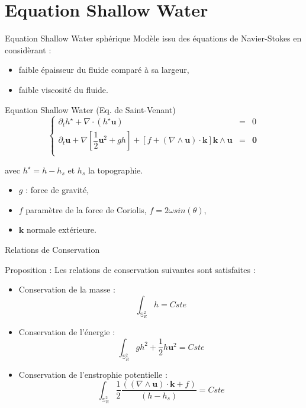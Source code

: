 \documentclass[11pt]{beamer}
\def\gint{\displaystyle\int}
\begin{document}
\section{Equation Shallow Water}
\begin{frame}{Equation Shallow Water sphérique}
Modèle issu des équations de Navier-Stokes en considèrant :
\begin{itemize}
\item faible épaisseur du fluide comparé à sa largeur,
\item faible viscosité du fluide.
\end{itemize}

\pause
\begin{block}{Equation Shallow Water (Eq. de Saint-Venant)}
\begin{equation}
\left\lbrace
\begin{array}{rcl}
\partial_t h^{\star} + \nabla \cdot \left( h^{\star} \mathbf{u} \right) & = & 0 \\
\partial_t \mathbf{u} + \nabla \left[ \dfrac{1}{2} \mathbf{u}^2 + gh \right] + \left[f + \left( \nabla \wedge \mathbf{u} \right) \cdot \mathbf{k} \right] \mathbf{k} \wedge \mathbf{u} & = & \mathbf{0} \\
\end{array}
\right.
\end{equation}

avec $h^{\star} = h - h_s$ et $h_s$ la topographie.
\end{block}

\begin{itemize}
\item $g$ : force de gravité,
\item $f$ paramètre de la force de Coriolis, $f=2 \omega sin( \theta )$,
\item $\mathbf{k}$ normale extérieure.
\end{itemize}

\end{frame}


\begin{frame}{Relations de Conservation}

\begin{block}{Proposition :}
Les relations de conservation suivantes sont satisfaites :
\begin{itemize}
\item Conservation de la masse :
$$\gint_{\mathbb{S}_R^2} h = Cste$$

\item Conservation de l'énergie :
$$\gint_{\mathbb{S}_R^2} gh^2+\dfrac{1}{2}h \mathbf{u}^2 = Cste$$

\item Conservation de l'enstrophie potentielle :
$$\gint_{\mathbb{S}_R^2} \dfrac{1}{2} \dfrac{\left( (\nabla \wedge \mathbf{u}) \cdot \mathbf{k} + f \right)}{\left( h - h_s\right)} = Cste$$
\end{itemize}
\end{block}

\end{frame}
\end{document}
